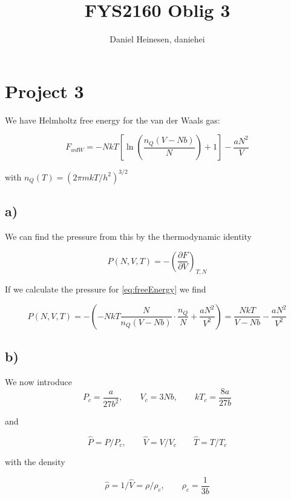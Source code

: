 \documentclass[a4paper,norsk, 10pt]{article}
\title{FYS2160 Oblig 3}
\author{Daniel Heinesen, daniehei}
\newcommand{\pd}[2]{\frac{\partial #1}{\partial #2}}
\begin{document}
\maketitle

\section{Project 3}
We have Helmholtz free energy for the van der Waals gas:

\begin{equation}
F_{wdW} = -NkT\left[\ln\left(\frac{n_Q(V-Nb)}{N}\right) + 1 \right] - \frac{aN^2}{V}
\label{eq:freeEnergy}
\end{equation}

with $n_Q(T) = (2\pi mkT/h^2)^{3/2}$

\subsection{a)}
We can find the pressure from this by the thermodynamic identity

\begin{equation}
P(N,V,T) = -\left(\pd{F}{V}\right)_{T,N}
\label{eq:formPressure}
\end{equation}

If we calculate the pressure for \eqref{eq:freeEnergy} we find

\begin{equation}
P(N,V,T) = -\left(-NkT\frac{N}{n_Q(V-Nb)}\cdot\frac{n_Q}{N} + \frac{aN^2}{V^2}\right) = \frac{NkT}{V-Nb} - \frac{aN^2}{V^2}
\label{eq:waalsP}
\end{equation}

\subsection{b)}

We now introduce
\begin{equation}
P_c = \frac{a}{27b^2}, \qquad V_c = 3Nb, \qquad kT_c = \frac{8a}{27b}
\end{equation}

and 

\begin{equation}
\hat{P} = P/P_c, \qquad \hat{V} = V/V_c \qquad \hat{T} = T/T_c
\end{equation}

with the density

\begin{equation}
\hat{\rho} = 1/\hat{V} =  \rho/\rho_c,\qquad \rho_c = \frac{1}{3b}
\label{eq:dimless_rho}
\end{equation}
\end{document}
